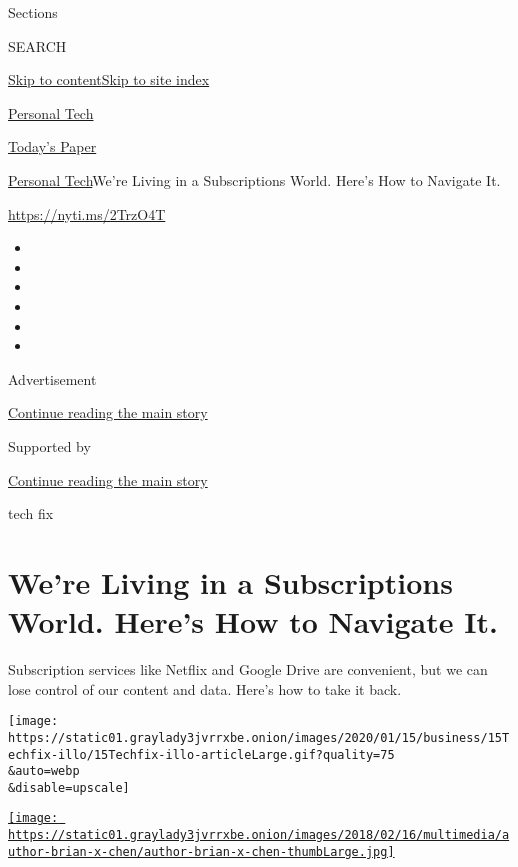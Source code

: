 Sections

SEARCH

\protect\hyperlink{site-content}{Skip to
content}\protect\hyperlink{site-index}{Skip to site index}

\href{https://www.nytimes3xbfgragh.onion/section/technology/personaltech}{Personal
Tech}

\href{https://myaccount.nytimes3xbfgragh.onion/auth/login?response_type=cookie\&client_id=vi}{}

\href{https://www.nytimes3xbfgragh.onion/section/todayspaper}{Today's
Paper}

\href{/section/technology/personaltech}{Personal Tech}\textbar{}We're
Living in a Subscriptions World. Here's How to Navigate It.

\url{https://nyti.ms/2TrzO4T}

\begin{itemize}
\item
\item
\item
\item
\item
\item
\end{itemize}

Advertisement

\protect\hyperlink{after-top}{Continue reading the main story}

Supported by

\protect\hyperlink{after-sponsor}{Continue reading the main story}

tech fix

\hypertarget{were-living-in-a-subscriptions-world-heres-how-to-navigate-it}{%
\section{We're Living in a Subscriptions World. Here's How to Navigate
It.}\label{were-living-in-a-subscriptions-world-heres-how-to-navigate-it}}

Subscription services like Netflix and Google Drive are convenient, but
we can lose control of our content and data. Here's how to take it back.

\texttt{[image: https://static01.graylady3jvrrxbe.onion/images/2020/01/15/business/15Techfix-illo/15Techfix-illo-articleLarge.gif?quality=75\\\&auto=webp\\\&disable=upscale]}

\href{https://www.nytimes3xbfgragh.onion/by/brian-x-chen}{\texttt{[image: https://static01.graylady3jvrrxbe.onion/images/2018/02/16/multimedia/author-brian-x-chen/author-brian-x-chen-thumbLarge.jpg]}}

